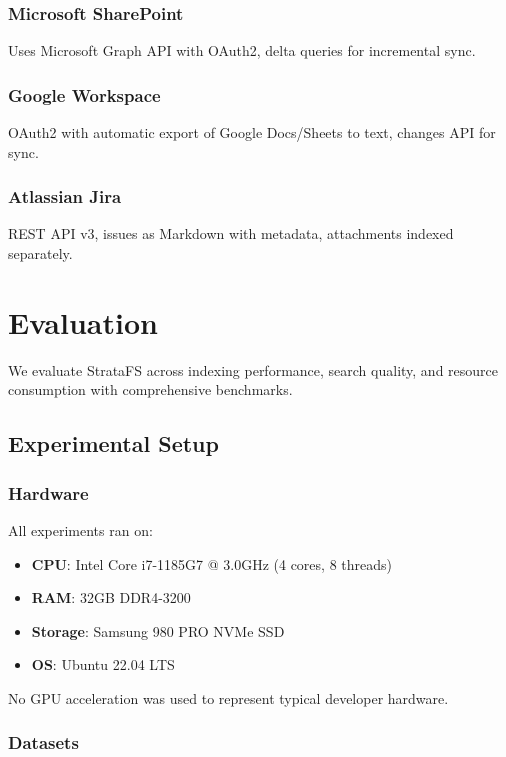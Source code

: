 \documentclass[conference]{IEEEtran}
\begin{document}
\subsubsection{Microsoft SharePoint}
Uses Microsoft Graph API with OAuth2, delta queries for incremental sync.

\subsubsection{Google Workspace}
OAuth2 with automatic export of Google Docs/Sheets to text, changes API for sync.

\subsubsection{Atlassian Jira}
REST API v3, issues as Markdown with metadata, attachments indexed separately.

\section{Evaluation}

We evaluate StrataFS across indexing performance, search quality, and resource consumption with comprehensive benchmarks.

\subsection{Experimental Setup}

\subsubsection{Hardware}
All experiments ran on:
\begin{itemize}
    \item \textbf{CPU}: Intel Core i7-1185G7 @ 3.0GHz (4 cores, 8 threads)
    \item \textbf{RAM}: 32GB DDR4-3200
    \item \textbf{Storage}: Samsung 980 PRO NVMe SSD
    \item \textbf{OS}: Ubuntu 22.04 LTS
\end{itemize}

No GPU acceleration was used to represent typical developer hardware.

\subsubsection{Datasets}
\end{document}
